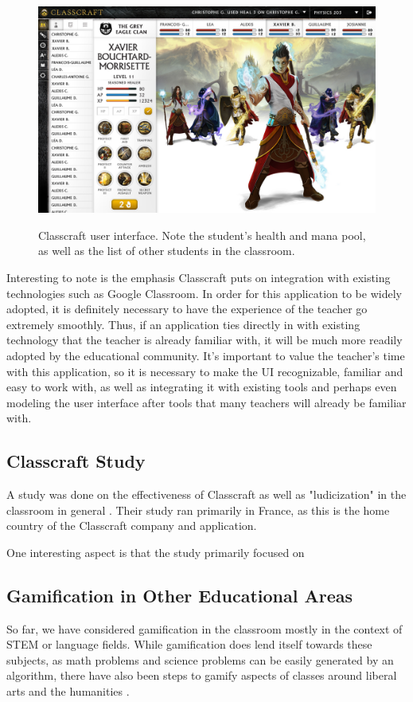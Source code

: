 \begin{figure}[h]
	\includegraphics[width=1.0\linewidth]{figures/classcraft}
	\caption{Classcraft user interface. Note the student's health and mana pool, as well as the list of other students in the classroom.}
	\label{fig:classcraft}
	\cite{hardy_heyes_1999}
\end{figure}

Interesting to note is the emphasis Classcraft puts on integration with existing technologies such as Google Classroom. In order for this application to be widely adopted, it is definitely necessary to have the experience of the teacher go extremely smoothly. Thus, if an application ties directly in with existing technology that the teacher is already familiar with, it will be much more readily adopted by the educational community. It's important to value the teacher's time with this application, so it is necessary to make the UI recognizable, familiar and easy to work with, as well as integrating it with existing tools and perhaps even modeling the user interface after tools that many teachers will already be familiar with.

\subsection{Classcraft Study}
A study was done on the effectiveness of Classcraft as well as "ludicization" in the classroom in general \cite{sanchez2016classcraft}. Their study ran primarily in France, as this is the home country of the Classcraft company and application.

One interesting aspect is that the study primarily focused on 

\subsection{Gamification in Other Educational Areas}
So far, we have considered gamification in the classroom mostly in the context of STEM or language fields. While gamification does lend itself towards these subjects, as math problems and science problems can be easily generated by an algorithm, there have also been steps to gamify aspects of classes around liberal arts and the humanities \cite{wagner2017digital}. 

